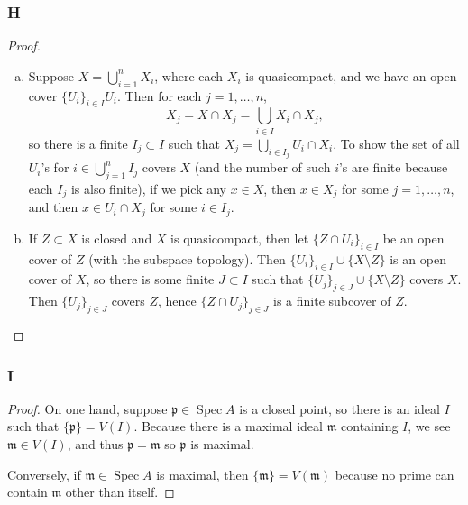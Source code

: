 \documentclass{article}
\newcommand{\frkm}{\mathfrak{m}}
\newcommand{\frkp}{\mathfrak{p}}
\DeclareMathOperator{\Spec}{\mathrm{Spec}}
\begin{document}
\subsubsection{H}\label{3.6.H}
\begin{proof}
    \begin{enumerate}[(a)]
        \item Suppose $X=\bigcup_{i=1}^n X_i$, where each $X_i$ is quasicompact, and we have an open cover $\{U_i\}_{i\in I} U_i$. Then for each $j=1,\dots, n$,
        \[
        X_j= X\cap X_j = \bigcup_{i\in I} X_i \cap X_j,
        \]
        so there is a finite $I_j\subset I$ such that $X_j=\bigcup_{i\in I_j} U_i \cap X_i$. To show the set of all $U_i$'s for $i \in \bigcup_{j=1}^n I_j$ covers $X$ (and the number of such $i$'s are finite because each $I_j$ is also finite), if we pick any $x\in X$, then $x\in X_j$ for some $j=1,\dots,n$, and then $x\in U_i\cap X_j$ for some $i\in I_j$.
        \item If $Z\subset X$ is closed and $X$ is quasicompact, then let $\{Z\cap U_i\}_{i\in I}$ be an open cover of $Z$ (with the subspace topology). Then $\{U_i\}_{i\in I} \cup \{X\setminus Z\}$ is an open cover of $X$, so there is some finite $J\subset I$ such that $\{U_j\}_{j\in J} \cup \{X\setminus Z\}$ covers $X$. Then $\{U_j\}_{j\in J}$ covers $Z$, hence $\{Z\cap U_j\}_{j\in J}$ is a finite subcover of $Z$.
    \end{enumerate}
\end{proof}
\subsubsection{I}\label{3.6.I}
\begin{proof}
    On one hand, suppose $\frkp\in \Spec A$ is a closed point, so there is an ideal $I$ such that $\{\frkp\} = V(I)$. Because there is a maximal ideal $\frkm$ containing $I$, we see $\frkm\in V(I)$, and thus $\frkp=\frkm$ so $\frkp$ is maximal.

    Conversely, if $\frkm\in \Spec A$ is maximal, then $\{\frkm\}=V(\frkm)$ because no prime can contain $\frkm$ other than itself.
\end{proof}
\end{document}
